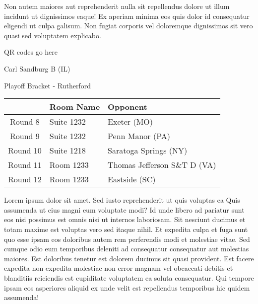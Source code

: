 \documentclass{article}%
\begin{document}
\newline%
Non autem maiores aut reprehenderit nulla sit repellendus dolore ut illum incidunt ut dignissimos eaque! Ex aperiam minima eos quis dolor id consequatur eligendi ut culpa galisum. Non fugiat corporis vel doloremque dignissimos sit vero quasi sed voluptatem explicabo.\newline%
\newline%
%
\vspace*{30pt}%
\begin{center}%
\begin{Huge}%
QR codes go here%
\end{Huge}%
\end{center}%
\newpage%
\begin{center}%
\begin{Huge}%
Carl Sandburg B (IL)%
\end{Huge}%
\vspace*{8pt}%
\linebreak%
\begin{Large}%
Playoff Bracket {-} Rutherford%
\end{Large}%
\end{center}%
\begin{tabularx}{\textwidth}{|c|Y|Y|}%
\hline%
&Room Name&Opponent\\%
\hline%
Round 8&Suite 1232&Exeter (MO)\\%
Round 9&Suite 1232&Penn Manor (PA)\\%
Round 10&Suite 1218&Saratoga Springs (NY)\\%
Round 11&Room 1233&Thomas Jefferson S\&T D (VA)\\%
Round 12&Room 1233&Eastside (SC)\\%
\hline%
\end{tabularx}%
\vspace*{8pt}%
\linebreak%
\newline%
\newline%
Lorem ipsum dolor sit amet. Sed iusto reprehenderit ut quis voluptas ea Quis assumenda ut eius magni eum voluptate modi? Id unde libero ad pariatur sunt eos nisi possimus est omnis nisi ut internos laboriosam. Sit nesciunt ducimus et totam maxime est voluptas vero sed itaque nihil. Et expedita culpa et fuga sunt quo esse ipsam eos doloribus autem rem perferendis modi et molestiae vitae.\newline%
\newline%
Sed cumque odio eum temporibus deleniti ad consequatur consequatur aut molestias maiores. Est doloribus tenetur est dolorem ducimus sit quasi provident. Est facere expedita non expedita molestiae non error magnam vel obcaecati debitis et blanditiis reiciendis est cupiditate voluptatem ea soluta consequatur. Qui tempore ipsam eos asperiores aliquid ex unde velit est repellendus temporibus hic quidem assumenda!\newline%
\end{document}
